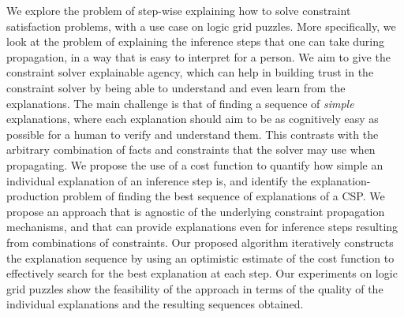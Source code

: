 We explore the problem of step-wise explaining how to solve constraint satisfaction problems, with a use case on logic grid puzzles. More specifically, we look at the problem of explaining the inference steps that one can take during propagation, in a way that is easy to interpret for a person. We aim to give the constraint solver explainable agency, which can help in building trust in the constraint solver by being able to understand and even learn from the explanations.
The main challenge is that of finding a sequence of \textit{simple} explanations, where each explanation should aim to be as cognitively easy as possible for a human to verify and understand them. This contrasts with the arbitrary combination of facts and constraints that the solver may use when propagating. %
We propose the use of a cost function to quantify how simple an individual explanation of an inference step is, and identify the explanation-production problem of finding the best sequence of explanations of a CSP. 
We propose an approach that is agnostic of the underlying constraint propagation mechanisms, and that can provide explanations even for inference steps resulting from combinations of constraints.
Our proposed algorithm iteratively constructs the explanation sequence by using an optimistic estimate of the cost function to effectively search for the best explanation at each step.
Our experiments on logic grid puzzles show the feasibility of the approach in terms of the quality of the individual explanations and the resulting sequences obtained.